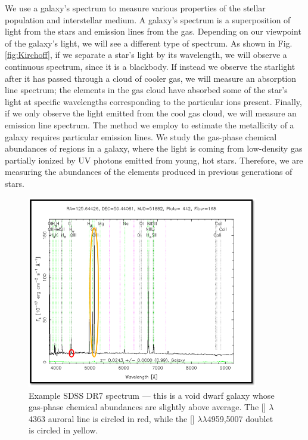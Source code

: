 We use a galaxy's spectrum to measure various properties of the stellar 
population and interstellar medium.  A galaxy's spectrum is a superposition of 
light from the stars and emission lines from the gas.  Depending on our 
viewpoint of the galaxy's light, we will see a different type of spectrum.  As 
shown in Fig. \ref{fig:Kirchoff}, if we separate a star's light by its 
wavelength, we will observe a continuous spectrum, since it is a blackbody.  If 
instead we observe the starlight after it has passed through a cloud of cooler 
gas, we will measure an absorption line spectrum; the elements in the gas cloud 
have absorbed some of the star's light at specific wavelengths corresponding to 
the particular ions present.  Finally, if we only observe the light emitted from 
the cool gas cloud, we will measure an emission line spectrum.  The method we 
employ to estimate the metallicity of a galaxy requires particular emission 
lines.  We study the gas-phase chemical abundances of  regions in a 
galaxy, where the light is coming from low-density gas partially ionized by UV 
photons emitted from young, hot stars.  Therefore, we are measuring the 
abundances of the elements produced in previous generations of stars.

\begin{figure}
    \includegraphics[width=0.9\textwidth]{Images/Intro/spectrum}
    \caption[Sample (void) dwarf galaxy spectrum]{Example SDSS DR7 spectrum --- 
    this is a void dwarf galaxy whose gas-phase chemical abundances are slightly 
    above average.  The [] $\lambda$4363 auroral line is circled in 
    red, while the [] $\lambda \lambda$4959,5007 doublet is circled in 
    yellow.}
    \label{fig:spectrum}
\end{figure}


